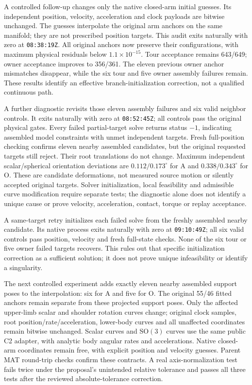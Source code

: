 \documentclass[11pt,a4paper]{article}
\begin{document}
A controlled follow-up changes only the native closed-arm initial guesses.
Its independent position, velocity, acceleration and clock payloads are
bitwise unchanged. The guesses interpolate the original arm anchors on the
same manifold; they are not prescribed position targets. This audit exits
naturally with zero at \texttt{08:38:19Z}. All original anchors now preserve
their configurations, with maximum physical residuals below
$1.1\times10^{-15}$. Tour acceptance remains 643/649; owner acceptance improves
to 356/361. The eleven previous owner anchor mismatches disappear, while the
six tour and five owner assembly failures remain. These results identify an
effective branch-initialization correction, not a qualified continuous path.

A further diagnostic revisits those eleven assembly failures and six valid
neighbor controls. It exits naturally with zero at \texttt{08:52:45Z}; all
controls pass the original physical gates. Every failed partial-target solve
returns status $-1$, indicating assembled model constraints with unmet
independent targets. Fresh full-position checking confirms eleven nearby
assembled candidates, but the original requested targets still reject.
Their root translations do not change. Maximum independent scalar/spherical
orientation deviations are $0.112/0.173^{\circ}$ for A and
$0.338/0.343^{\circ}$ for O. These are candidate deformations, not measured
source motion or silently accepted original targets. Solver initialization,
local feasibility and admissible curve modification require separate tests;
the diagnostic alone does not identify a unique cause or prove velocity,
acceleration, contact, torque or replay acceptance.

A same-target retry initializes each failed solve from the freshly assembled
nearby candidate. Its native process exits naturally with zero at
\texttt{09:10:49Z}; all six valid controls pass position, velocity and fresh
full-state checks. None of the six tour or five owner failed targets recovers.
This rules out that specific initialization correction as a sufficient
solution; it does not prove unique infeasibility or identify a singularity.

The next controlled experiment adds exactly eleven nearby assembled support
poses to the interpolation: six for A and five for O. The original 55/46
fitted anchors remain separate from these projected support poses. Only the
affected upper-limb scalar and shoulder rotation curves change; original
clock samples, root position/rate/acceleration, lower-body curves and all
unaffected coordinates remain bitwise unchanged. Scalar curves and
\(\mathrm{SO}(3)\) curves use the same public C2 adapter, with analytic body
angular rates and accelerations. Native closed-arm coordinates remain free,
with explicit position and velocity guesses. Parent MAT round-trip checks
confirm these contracts. A real axis-normalization test fails twice under
the proposal's unintended relative tolerance and passes all three tests
after the reviewed absolute-tolerance correction.
\end{document}
